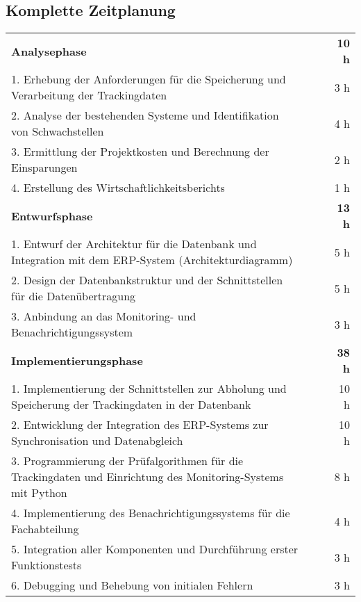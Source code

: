 \subsection{Komplette Zeitplanung}
\label{app:ZeitplanungKomplett}

\begin{tabularx}{\textwidth}{Xrrr}
\label{app:Zeitplanung}\\
\rowcolor{heading}\textbf{Analysephase} & \textbf{} & \textbf{} & \textbf{10 h} \\
1. Erhebung der Anforderungen für die Speicherung und Verarbeitung der Trackingdaten &       &    & 3 h  \\
\rowcolor{odd}2. Analyse der bestehenden Systeme und Identifikation von Schwachstellen &       &    & 4 h  \\
3. Ermittlung der Projektkosten und Berechnung der Einsparungen &       &    & 2 h \\
\rowcolor{odd}4. Erstellung des Wirtschaftlichkeitsberichts &       &    & 1 h  \\
\rowcolor{heading}\textbf{Entwurfsphase} & \textbf{} & \textbf{} & \textbf{13 h} \\
1. Entwurf der Architektur für die Datenbank und Integration mit dem ERP-System (Architekturdiagramm) &       &    & 5 h \\
\rowcolor{odd}2. Design der Datenbankstruktur und der Schnittstellen für die Datenübertragung &       &    & 5 h \\
3. Anbindung an das Monitoring- und Benachrichtigungssystem &       &    & 3 h  \\
\rowcolor{heading}\textbf{Implementierungsphase} & \textbf{} & \textbf{} & \textbf{38 h} \\
1. Implementierung der Schnittstellen zur Abholung und Speicherung der Trackingdaten in der Datenbank &       &    & 10 h  \\
\rowcolor{odd}2. Entwicklung der Integration des ERP-Systems zur Synchronisation und Datenabgleich &       &    & 10 h  \\
3. Programmierung der Prüfalgorithmen für die Trackingdaten und Einrichtung des Monitoring-Systems mit Python &       &    & 8 h  \\
\rowcolor{odd}4. Implementierung des Benachrichtigungssystems für die Fachabteilung &       &    & 4 h \\
5. Integration aller Komponenten und Durchführung erster Funktionstests &       &    & 3 h \\
\rowcolor{odd}6. Debugging und Behebung von initialen Fehlern &       &    & 3 h \\

\end{tabularx}

